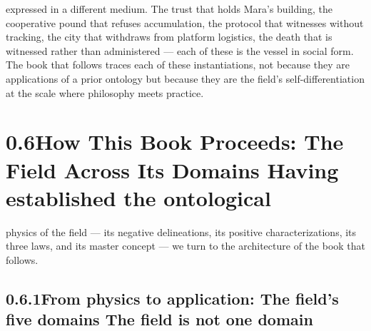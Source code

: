 expressed in a different medium. The trust that holds Mara’s building, the cooperative pound that refuses accumulation, the protocol that witnesses without tracking, the city that withdraws from platform logistics, the death that is witnessed rather than administered — each of these is the vessel in social form. The book that follows traces each of these instantiations, not because they are applications of a prior ontology but because they are the field’s self-differentiation at the scale where philosophy meets practice.

\section{0.6\quad How This Book Proceeds: The Field Across Its Domains Having established the ontological}

physics of the field — its negative delineations, its positive characterizations, its three laws, and its master concept — we turn to the architecture of the book that follows.

\subsection{0.6.1\quad From physics to application: The field’s five domains The field is not one domain}

